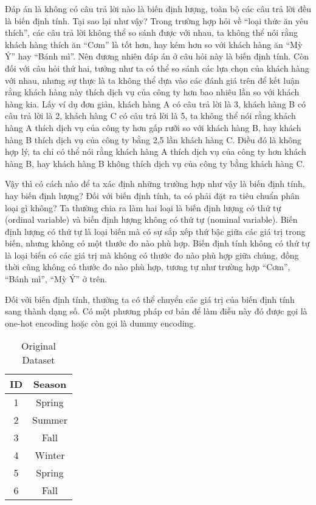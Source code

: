 \documentclass[
]{article}
\begin{document}
Đáp án là không có câu trả lời nào là biến định lượng, toàn bộ các câu trả lời đều là biến định tính. Tại sao lại như vậy? Trong trường hợp hỏi về ``loại thức ăn yêu thích'', các câu trả lời không thể so sánh được với nhau, ta không thể nói rằng khách hàng thích ăn ``Cơm'' là tốt hơn, hay kém hơn so với khách hàng ăn ``Mỳ Ý'' hay ``Bánh mì''. Nên đương nhiên đáp án ở câu hỏi này là biến định tính. Còn đối với câu hỏi thứ hai, tưởng như ta có thể so sánh các lựa chọn của khách hàng với nhau, nhưng sự thực là ta không thể dựa vào các đánh giá trên để kết luận rằng khách hàng này thích dịch vụ của công ty hơn bao nhiêu lần so với khách hàng kia. Lấy ví dụ đơn giản, khách hàng A có câu trả lời là 3, khách hàng B có câu trả lời là 2, khách hàng C có câu trả lời là 5, ta không thể nói rằng khách hàng A thích dịch vụ của công ty hơn gấp rưỡi so với khách hàng B, hay khách hàng B thích dịch vụ của công ty bằng 2,5 lần khách hàng C. Điều đó là không hợp lý, ta chỉ có thể nói rằng khách hàng A thích dịch vụ của công ty hơn khách hàng B, hay khách hàng B không thích dịch vụ của công ty bằng khách hàng C.

Vậy thì có cách nào để ta xác định những trường hợp như vậy là biến định tính, hay biến định lượng? Đối với biến định tính, ta có phải đặt ra tiêu chuẩn phân loại gì không? Ta thường chia ra làm hai loại là biến định lượng có thứ tự (ordinal variable) và biến định lượng không có thứ tự (nominal variable). Biến định lượng có thứ tự là loại biến mà có sự sắp xếp thứ bậc giữa các giá trị trong biến, nhưng không có một thước đo nào phù hợp. Biến định tính không có thứ tự là loại biến có các giá trị mà không có thước đo nào phù hợp giữa chúng, đồng thời cũng không có thước đo nào phù hợp, tương tự như trường hợp ``Cơm'', ``Bánh mì'', ``Mỳ Ý'' ở trên.

Đối với biến định tính, thường ta có thể chuyển các giá trị của biến định tính sang thành dạng số. Có một phương pháp cơ bản để làm điều này đó được gọi là one-hot encoding hoặc còn gọi là dummy encoding.

\begin{table}
\centering
\caption{\label{tab:unnamed-chunk-3}Original Dataset}
\centering
\begin{tabular}[t]{c|c}
\hline
ID & Season\\
\hline
1 & Spring\\
\hline
2 & Summer\\
\hline
3 & Fall\\
\hline
4 & Winter\\
\hline
5 & Spring\\
\hline
6 & Fall\\
\hline
\end{tabular}
\end{table}
\end{document}
